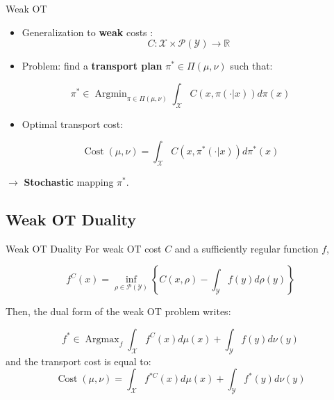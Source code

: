 \documentclass{beamer}
\newcommand{\R}{\mathbb{R}}
\DeclareMathOperator*{\Argmin}{\text{Argmin}}
\DeclareMathOperator*{\Argmax}{\text{Argmax}}
\DeclareMathOperator*{\Cost}{\text{Cost}}
\begin{document}
\begin{frame}{Weak OT}
    \begin{itemize}
        \item Generalization to \textbf{weak} costs :
              $$C: \mathcal{X}\times \mathcal{P}(\mathcal{Y})\to\R$$
        \item Problem: find a \textbf{transport plan} $\pi^*\in \Pi(\mu,\nu)$ such that:
    \end{itemize}
    \begin{equation}
        \pi^* \in \Argmin_{\pi\in\Pi(\mu,\nu)} \int_{\mathcal{X}} C(x,\pi(\cdot|x))d\pi(x)
    \end{equation}
    \begin{itemize}
        \item Optimal transport cost:
    \end{itemize}
    \begin{equation}
        \Cost(\mu,\nu) = \int_{\mathcal{X}} C(x,\pi^*(\cdot|x))d\pi^*(x)
    \end{equation}

    $\rightarrow$ \textbf{Stochastic} mapping $\pi^*$.
\end{frame}

\subsection{Weak OT Duality}
\begin{frame}{Weak OT Duality}
    For weak OT cost $C$ and a sufficiently regular function $f$,

    \begin{equation}
        f^C(x) = \inf_{\rho\in \mathcal{P}(\mathcal{Y})} \left\{C(x,\rho)-\int_{\mathcal{Y}}f(y)d\rho(y)\right\}
    \end{equation}

    Then, the dual form of the weak OT problem writes:

    \begin{equation}
        f^*\in\Argmax_{f} \int_{\mathcal{X}} f^C(x)d\mu(x) + \int_{\mathcal{Y}} f(y)d\nu(y)
    \end{equation}
    and the transport cost is equal to:
    \begin{equation}
        \Cost(\mu,\nu) = \int_{\mathcal{X}} f^{*C}(x)d\mu(x) + \int_{\mathcal{Y}} f^*(y)d\nu(y)
    \end{equation}

\end{frame}
\end{document}
